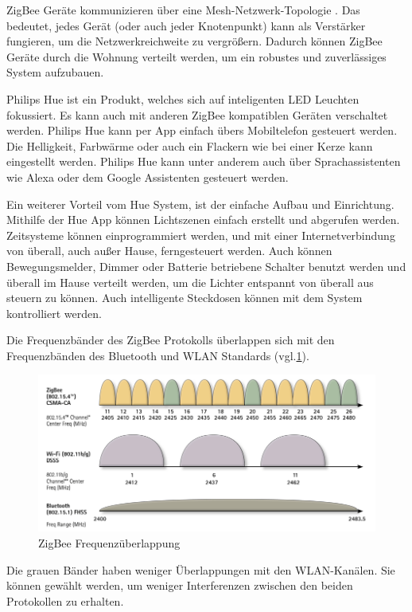 ZigBee Geräte kommunizieren über eine Mesh-Netzwerk-Topologie \cite[S.10]{GettingStartedWithZigBee}. Das bedeutet, jedes Gerät (oder auch jeder Knotenpunkt) kann als Verstärker fungieren, um die Netzwerkreichweite zu vergrößern. Dadurch können ZigBee Geräte durch die Wohnung verteilt werden, um ein robustes und zuverlässiges System aufzubauen.

Philips Hue ist ein Produkt, welches sich auf inteligenten LED Leuchten fokussiert. Es kann auch mit anderen ZigBee kompatiblen Geräten verschaltet werden. Philips Hue kann per App einfach übers Mobiltelefon gesteuert werden. Die Helligkeit, Farbwärme oder auch ein Flackern wie bei einer Kerze kann eingestellt werden. Philips Hue kann unter anderem auch über Sprachassistenten wie Alexa oder dem Google Assistenten gesteuert werden.

Ein weiterer Vorteil vom Hue System, ist der einfache Aufbau und Einrichtung. Mithilfe der Hue App können Lichtszenen einfach erstellt und abgerufen werden. Zeitsysteme können einprogrammiert werden, und mit einer Internetverbindung von überall, auch außer Hause, ferngesteuert werden. Auch können Bewegungsmelder, Dimmer oder Batterie betriebene Schalter benutzt werden und überall im Hause verteilt werden, um die Lichter entspannt von überall aus steuern zu können. Auch intelligente Steckdosen können mit dem System kontrolliert werden. 

Die Frequenzbänder des ZigBee Protokolls überlappen sich mit den Frequenzbänden des Bluetooth und WLAN Standards (vgl.\ref{fig:ZigBee_Frequency_bands}).
\begin{figure}[H]
	\centering
	\includegraphics[width=.8\linewidth]{Pictures/ZigBeeRfOverlap}
	\caption{ZigBee Frequenzüberlappung \cite[S.23]{GettingStartedWithZigBee}}
	\label{fig:ZigBee_Frequency_bands}
\end{figure}
Die grauen Bänder haben weniger Überlappungen mit den WLAN-Kanälen. Sie können gewählt werden, um weniger Interferenzen zwischen den beiden Protokollen zu erhalten.

